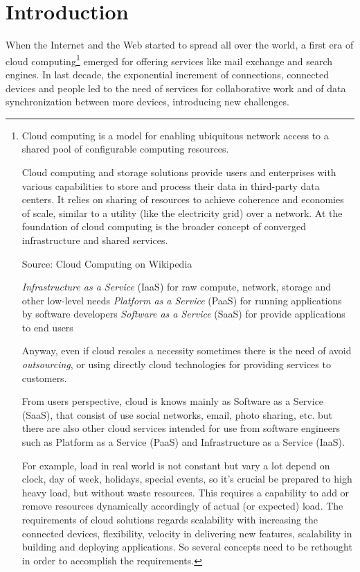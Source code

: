 \chapter{Introduction}\label{introduction}

When the Internet and the Web started to spread all over the world, a first era of cloud computing\footnote{Cloud computing is a model for enabling ubiquitous network access to a shared pool of configurable computing resources.

Cloud computing and storage solutions provide users and enterprises with various capabilities to store and process their data in third-party data centers. It relies on sharing of resources to achieve coherence and economies of scale, similar to a utility (like the electricity grid) over a network. At the foundation of cloud computing is the broader concept of converged infrastructure and shared services.

Source: Cloud Computing on Wikipedia\cite{CloudComputing}

\textit{Infrastructure as a Service} (IaaS) for raw compute, network, storage and other low-level needs
\textit{Platform as a Service} (PaaS) for running applications by software developers
\textit{Software as a Service} (SaaS) for provide applications to end users
  
Anyway, even if cloud resoles a necessity sometimes there is the need of
avoid \textit{outsourcing}, or using directly cloud technologies for
providing services to customers.

From users perspective, cloud is knows mainly as Software as a Service (SaaS), that consist of use social networks, email, photo sharing, etc. but there are also other cloud services intended for use from software engineers such as Platform as a Service (PaaS) and Infrastructure as a Service (IaaS).

For example, load in real world is not constant but vary a lot depend on clock, day of week, holidays, special events, so it's crucial be prepared to high heavy load, but without waste resources. This requires a capability to add or remove resources dynamically accordingly of actual (or expected) load. The requirements of cloud solutions regards scalability with increasing the connected devices, flexibility, velocity in delivering new features, scalability in building and deploying applications. So several concepts need to be rethought in order to accomplish the requirements.

} emerged for offering services like mail exchange and search engines.  In last decade,  the exponential increment of connections, connected devices and people led to the need of services for collaborative work and of data synchronization between more devices, introducing new challenges.

